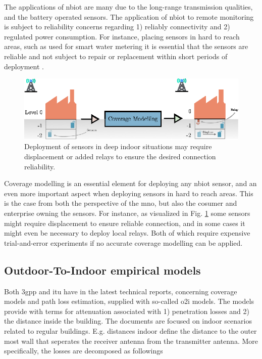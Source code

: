 The applications of \gls{nbiot} are many due to the long-range transmission qualities, and the battery operated sensors. The application of \gls{nbiot} to remote monitoring is subject to reliability concerns regarding 1) reliably connectivity and 2) regulated power consumption. For instance, placing sensors in hard to reach areas, such as used for smart water metering it is essential that the sensors are reliable and not subject to repair or replacement within short periods of deployment \cite{Popli2019AChallenges}. 



\begin{figure}
    \centering
    \includegraphics{chapters/part_pathloss/figures/outdoor_to_indoor/approach_figure.eps}
    \caption{Deployment of sensors in deep indoor situations may require displacement or added relays to ensure the desired connection reliability.}
    \label{fig:outdoor_to_indoor_approach}
\end{figure}

Coverage modelling is an essential element for deploying any \gls{nbiot} sensor, and an even more important aspect when deploying sensors in hard to reach areas. This is the case from both the perspective of the \gls{mno}, but also the cosumer and enterprise owning the sensors. For instance, as visualized in Fig. \ref{fig:outdoor_to_indoor_approach} some sensors might require displacement to ensure reliable connection, and in some cases it might even be necessary to deploy local relays. Both of which require expensive trial-and-error experiments if no accurate coverage modelling can be applied.  

\subsection{Outdoor-To-Indoor empirical models}
Both \gls{3gpp} and \gls{itu} have in the latest technical reports, concerning coverage models and path loss estimation, supplied with so-called \gls{o2i} models. The models provide with terms for attenuation associated with 1) penetration losses and 2) the distance inside the building. The documents are focused on indoor scenarios related to regular buildings. E.g. distances indoor define the distance to the outer most wall that seperates the receiver antenna from the transmitter antenna. More specifically, the losses are decomposed as followings

